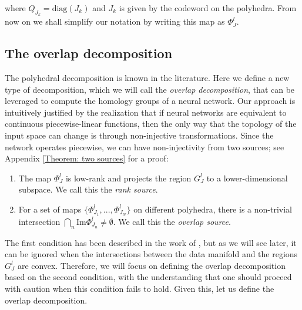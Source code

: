 \documentclass[10pt]{article} %
\theoremstyle{plain}
\theoremstyle{definition}
\theoremstyle{remark}
\begin{document}
where $Q_{J_k} = \text{diag}(J_k)$ and $J_k$ is given by the codeword on the polyhedra. From now on we shall simplify our notation by writing this map as $\Phi^l_J$.

\subsection{The overlap decomposition}
The polyhedral decomposition is known in the literature. Here we define a new type of decomposition, which we will call the \textit{overlap decomposition}, that can be leveraged to compute the homology groups of a neural network. Our approach is intuitively justified by the realization that if neural networks are equivalent to continuous piecewise-linear functions, then the only way that the topology of the input space can change is through non-injective transformations. Since the network operates piecewise, we can have non-injectivity from two sources; see Appendix \ref{Theorem: two sources} for a proof:

\begin{enumerate}
    \item The map $\Phi^l_J$ is low-rank and projects the region $G^l_J$ to a lower-dimensional subspace. We call this the \textit{rank source}.
    \item For a set of maps $\{\Phi^l_{J_1},...,\Phi^l_{J_N}\}$ on different polyhedra, there is a non-trivial intersection $\bigcap\limits_{n} \text{Im}\Phi^l_{J_n} \neq \emptyset$. We call this the \textit{overlap source}.
\end{enumerate}

The first condition has been described in the work of \citet{beshkov2024rank}, but as we will see later, it can be ignored when the intersections between the data manifold and the regions $G^l_J$ are convex. Therefore, we will focus on defining the overlap decomposition based on the second condition, with the understanding that one should proceed with caution when this condition fails to hold. Given this, let us define the overlap decomposition.
\end{document}
